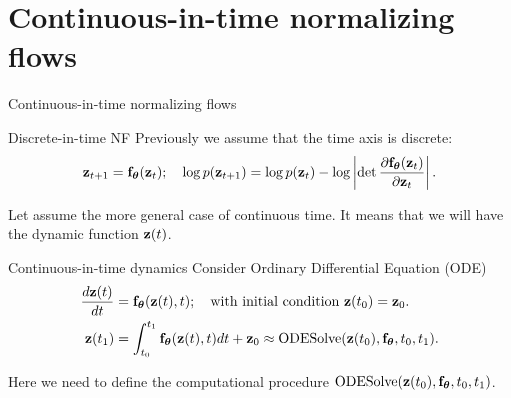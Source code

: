\section{Continuous-in-time normalizing flows}
\begin{frame}{Continuous-in-time normalizing flows}
	\vspace{-0.3cm}
	\begin{block}{Discrete-in-time NF}
		Previously we assume that the time axis is discrete:
		\vspace{-0.3cm}
		  \[
			  \mathbf{z}_{t+1} = \mathbf{f}_{\boldsymbol{\theta}}(\mathbf{z}_t); \quad \log p(\mathbf{z}_{t+1}) = \log p(\mathbf{z}_{t}) - \log \left| \det \frac{\partial \mathbf{f}_{\boldsymbol{\theta}}(\mathbf{z}_t)}{\partial \mathbf{z}_{t}} \right| .
		  \]
		\vspace{-0.6cm}
	\end{block}
	Let assume the more general case of continuous time. It means that we will have the dynamic function $\mathbf{z}(t)$.
	\begin{block}{Continuous-in-time dynamics}
		Consider Ordinary Differential Equation (ODE)
		\vspace{-0.3cm}
		\begin{align*}
		   \frac{d \mathbf{z}(t)}{dt} &= \mathbf{f}_{\boldsymbol{\theta}}(\mathbf{z}(t), t); \quad \text{with initial condition }\mathbf{z}(t_0) = \mathbf{z}_0. \\
		   \mathbf{z}(t_1) &= \int^{t_1}_{t_0} \mathbf{f}_{\boldsymbol{\theta}}(\mathbf{z}(t), t) d t  + \mathbf{z}_0 \approx \text{ODESolve}(\mathbf{z}(t_0), \mathbf{f}_{\boldsymbol{\theta}}, t_0,t_1).
		\end{align*}
		\vspace{-0.6cm}
	\end{block}
	Here we need to define the computational procedure $\text{ODESolve}(\mathbf{z}(t_0), \mathbf{f}_{\boldsymbol{\theta}}, t_0,t_1)$.
\end{frame}
